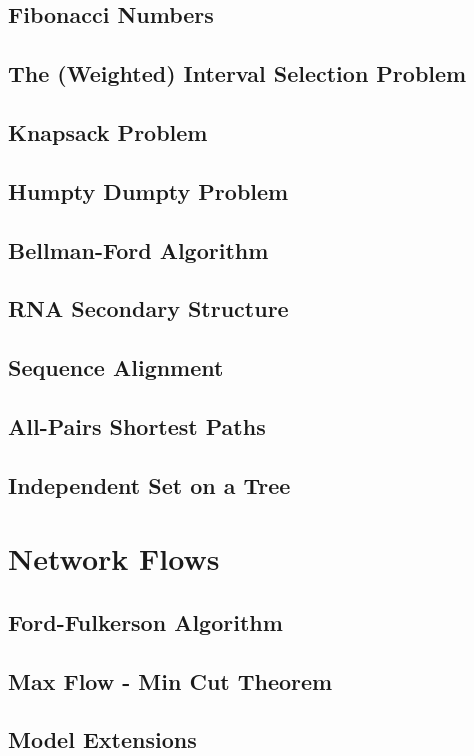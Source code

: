 \documentclass{article}
\begin{document}
\subsection{Fibonacci Numbers}
\subsection{The (Weighted) Interval Selection Problem}
\subsection{Knapsack Problem}
\subsection{Humpty Dumpty Problem}
\subsection{Bellman-Ford Algorithm}
\subsection{RNA Secondary Structure}
\subsection{Sequence Alignment}
\subsection{All-Pairs Shortest Paths}
\subsection{Independent Set on a Tree}
\newpage


\section{Network Flows}
\subsection{Ford-Fulkerson Algorithm}
\subsection{Max Flow - Min Cut Theorem}
\subsection{Model Extensions}
\end{document}
